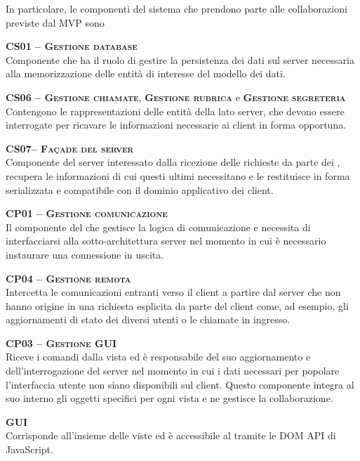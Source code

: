 In particolare, le componenti del sistema che prendono parte alle collaborazioni previste dal  MVP sono
\begin{description}
  \item{\scshape\bfseries CS01 -- Gestione database}\\
Componente che ha il ruolo di gestire la persistenza dei dati sul server necessaria alla memorizzazione delle entità di interesse del modello dei dati.

  \item{\textsc{\bfseries CS06 -- Gestione chiamate}, \textsc{\bfseries Gestione rubrica} e \textsc{\bfseries Gestione segreteria}}\\
Contengono le rappresentazioni delle entità della  lato server, che devono essere interrogate per ricavare le informazioni necessarie ai client in forma opportuna.

  \item{\scshape\bfseries CS07-- Façade del server}\\
Componente del server interessato dalla ricezione delle richieste da parte dei , recupera le informazioni di cui questi ultimi necessitano e le restituisce in forma serializzata e compatibile con il dominio applicativo dei client.

  \item{\scshape\bfseries CP01 -- Gestione comunicazione}\\
Il componente del  che gestisce la logica di comunicazione e necessita di interfacciarsi alla sotto-architettura server nel momento in cui è necessario instaurare una connessione in uscita.

  \item{\scshape\bfseries CP04 -- Gestione remota}\\
Intercetta le comunicazioni entranti verso il client a partire dal server che non hanno origine in una richiesta esplicita da parte del client come, ad esempio, gli aggiornamenti di stato dei diversi utenti o le chiamate in ingresso.
  
  \item{\scshape\bfseries CP03 -- Gestione GUI}\\
Riceve i comandi dalla vista ed è responsabile del suo aggiornamento e dell'interrogazione del server nel momento in cui i dati necessari per popolare l'interfaccia utente non siano disponibili sul client. Questo componente integra al suo interno gli oggetti  specifici per ogni vista e ne gestisce la collaborazione.

  \item{\scshape\bfseries GUI}\\
Corrisponde all'insieme delle viste ed è accessibile al  tramite le DOM API di JavaScript.
\end{description}

